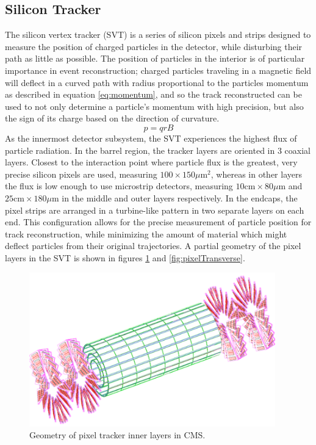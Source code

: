 \subsection{Silicon Tracker} 
\label{subsec:tracker}
The silicon vertex tracker (SVT) is a series of silicon pixels and strips designed to measure the position of charged particles in the detector, while disturbing their path as little as possible. The position of particles in the interior is of particular importance in event reconstruction; charged particles traveling in a magnetic field will deflect in a curved path with radius proportional to the particles momentum as described in equation \ref{eq:momentum}, and so the track reconstructed can be used to not only determine a particle's momentum with high precision, but also the sign of its charge based on the direction of curvature.
\begin{equation}
	\label{eq:momentum}
	p = qrB
\end{equation}
As the innermost detector subsystem, the SVT experiences the highest flux of particle radiation. In the barrel region, the tracker layers are oriented in 3 coaxial layers. Closest to the interaction point where particle flux is the greatest, very precise silicon pixels are used, measuring $100\times150 \mu \text{m}^2$, whereas in other layers the flux is low enough to use microstrip detectors, measuring $10 \text{cm}\times80\mu \text{m}$ and  $25 \text{cm}\times180\mu \text{m}$ in the middle and outer layers respectively. In the endcaps, the pixel strips are arranged in a turbine-like pattern in two separate layers on each end. This configuration allows for the precise measurement of particle position for track reconstruction, while minimizing the amount of material which might deflect particles from their original trajectories. A partial geometry of the pixel layers in the SVT is shown in figures \ref{fig:pixelLayout} and \ref{fig:pixelTransverse}.
\begin{figure}
	\centering
	\includegraphics[width=0.95\textwidth]{detector/figs/trackerGeometry}
	\renewcommand{\baselinestretch}{1.0}
	\caption[Geometry of pixel tracker inner layers in CMS.]{Geometry of pixel tracker inner layers in CMS.}
	\label{fig:pixelLayout}
\end{figure}
